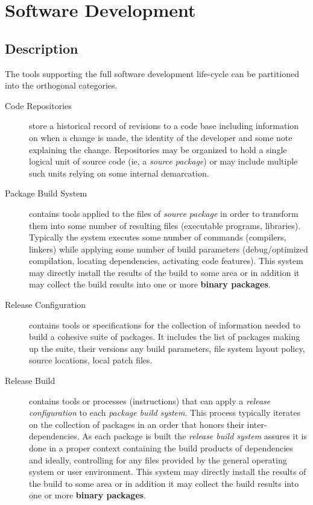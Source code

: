 \section{Software Development}


\subsection{Description}

The tools supporting the full software development life-cycle can be
partitioned into the orthogonal categories.

\begin{description}
\item[Code Repositories] store a historical record of revisions to a
  code base including information on when a change is made, the
  identity of the developer and some note explaining the change.
  Repositories may be organized to hold a single logical unit of
  source code (ie, a \textit{source package}) or may include multiple
  such units relying on some internal demarcation.

\item[Package Build System] contains tools applied to the files of
  \textit{source package} in order to transform them into some number
  of resulting files (executable programs, libraries).  Typically the
  system executes some number of commands (compilers, linkers) while
  applying some number of build parameters (debug/optimized
  compilation, locating dependencies, activating code features).  This
  system may directly install the results of the build to some area or
  in addition it may collect the build results into one or more
  \textbf{binary packages}.

\item[Release Configuration] contains tools or specifications for the
  collection of information needed to build a cohesive suite of
  packages.  It includes the list of packages making up the suite,
  their versions any build parameters, file system layout policy,
  source locations, local patch files.

\item[Release Build] contains tools or processes (instructions) that can
  apply a \textit{release configuration} to each \textit{package build
    system}.  This process typically iterates on the collection of
  packages in an order that honors their inter-dependencies.  As each
  package is built the \textit{release build system} assures it is
  done in a proper context containing the build products of
  dependencies and ideally, controlling for any files provided by the
  general operating system or user environment. This system may
  directly install the results of the build to some area or in
  addition it may collect the build results into one or more
  \textbf{binary packages}.


\end{description}
